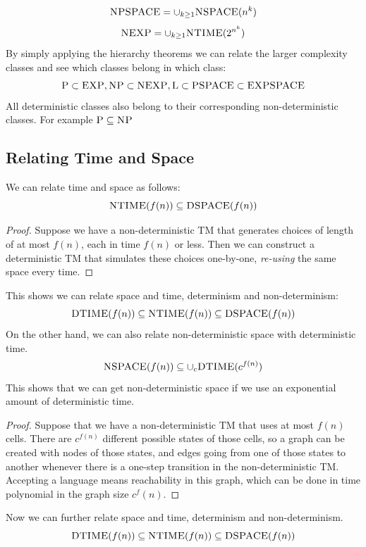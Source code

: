 \documentclass{article}
\theoremstyle{definition}
\begin{document}
\begin{equation}
\textsc{NPSPACE} = \cup_{k \geq 1}\textsc{NSPACE}(n^k)
\end{equation}
\begin{equation}
\textsc{NEXP} = \cup_{k \geq 1}\textsc{NTIME}(2^{n^k})
\end{equation}
By simply applying the hierarchy theorems we can relate the larger complexity classes and see which classes belong in which class:
\begin{equation}
\textsc{P} \subset \textsc{EXP}, \textsc{NP} \subset \textsc{NEXP}, \textsc{L} \subset \textsc{PSPACE} \subset \textsc{EXPSPACE}
\end{equation}
All deterministic classes also belong to their corresponding non-deterministic classes. For example $\textsc{P} \subseteq \textsc{NP}$
\subsection{Relating Time and Space}
We can relate time and space as follows:
\begin{equation}
\textsc{NTIME}(f(n)) \subseteq \textsc{DSPACE}(f(n))
\end{equation}
\begin{proof}
Suppose we have a non-deterministic TM that generates choices of length of at most $f(n)$, each in time $f(n)$ or less. Then we can construct a deterministic TM that simulates these choices one-by-one, \textit{re-using} the same space every time.
\end{proof}
\noindent
This shows we can relate space and time, determinism and non-determinism:
\begin{equation}
\textsc{DTIME}(f(n)) \subseteq \textsc{NTIME}(f(n)) \subseteq \textsc{DSPACE}(f(n))
\end{equation}
On the other hand, we can also relate non-deterministic space with deterministic time. 
\begin{equation}
\textsc{NSPACE}(f(n)) \subseteq \cup_{c}\textsc{DTIME}(c^{f(n)})
\end{equation}
This shows that we can get non-deterministic space if we use an exponential amount of deterministic time. 
\begin{proof}
Suppose that we have a non-deterministic TM that uses at most $f(n)$ cells. There are $c^{f(n)}$ different possible states of those cells, so a graph can be created with nodes of those states, and edges going from one of those states to another whenever there is a one-step transition in the non-deterministic TM. Accepting a language means reachability in this graph, which can be done in time polynomial in the graph size $c^f(n)$. 
\end{proof}
\noindent
Now we can further relate space and time, determinism and non-determinism. 
\begin{equation}
\textsc{DTIME}(f(n)) \subseteq \textsc{NTIME}(f(n)) \subseteq \textsc{DSPACE}(f(n))
\end{equation}
\end{document}
